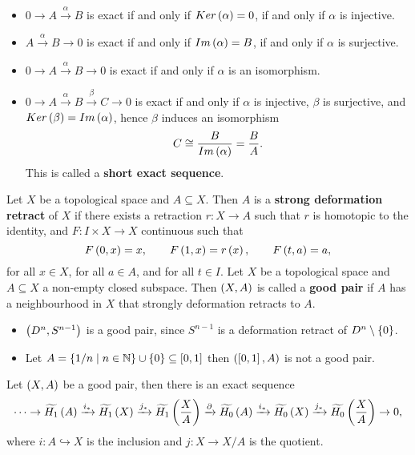 \begin{example*}
\hfill
\begin{itemize}
\item $ 0 \to A \xrightarrow{\alpha} B $ is exact if and only if $ Ker\left( \alpha \right) = 0 $, if and only if $ \alpha $ is injective.
\item $ A \xrightarrow{\alpha} B \to 0 $ is exact if and only if $ Im\left( \alpha \right) = B $, if and only if $ \alpha $ is surjective.
\item $ 0 \to A \xrightarrow{\alpha} B \to 0 $ is exact if and only if $ \alpha $ is an isomorphism.
\item $ 0 \to A \xrightarrow{\alpha} B \xrightarrow{\beta} C \to 0 $ is exact if and only if $ \alpha $ is injective, $ \beta $ is surjective, and $ Ker\left( \beta \right) = Im\left( \alpha \right) $, hence $ \beta $ induces an isomorphism
$$ C \cong \dfrac{B}{Im\left( \alpha \right)} = \dfrac{B}{A}. $$
This is called a \textbf{short exact sequence}.
\end{itemize}
\end{example*}

\begin{definition*}
Let $ X $ be a topological space and $ A \subseteq X $. Then $ A $ is a \textbf{strong deformation retract} of $ X $ if there exists a retraction $ r : X \to A $ such that $ r $ is homotopic to the identity, and $ F : I \times X \to X $ continuous such that
$$ F\left( 0, x \right) = x, \qquad F\left( 1, x \right) = r\left( x \right), \qquad F\left( t, a \right) = a, $$
for all $ x \in X $, for all $ a \in A $, and for all $ t \in I $. Let $ X $ be a topological space and $ A \subseteq X $ a non-empty closed subspace. Then $ \left( X, A \right) $ is called a \textbf{good pair} if $ A $ has a neighbourhood in $ X $ that strongly deformation retracts to $ A $.
\end{definition*}

\begin{example*}
\hfill
\begin{itemize}
\item $ \left( D^n, S^{n - 1} \right) $ is a good pair, since $ S^{n - 1} $ is a deformation retract of $ D^n \setminus \left\{ 0 \right\} $.
\item Let $ A = \left\{ 1 / n \mid n \in \mathbb{N} \right\} \cup \left\{ 0 \right\} \subseteq \left[ 0, 1 \right] $ then $ \left( \left[ 0, 1 \right], A \right) $ is not a good pair.
\end{itemize}
\end{example*}

\begin{theorem}
\label{thm:2.13}
Let $ \left( X, A \right) $ be a good pair, then there is an exact sequence
$$ \dots \to \widetilde{H_1}\left( A \right) \xrightarrow{i_*} \widetilde{H_1}\left( X \right) \xrightarrow{j_*} \widetilde{H_1}\left( \dfrac{X}{A} \right) \xrightarrow{\partial} \widetilde{H_0}\left( A \right) \xrightarrow{i_*} \widetilde{H_0}\left( X \right) \xrightarrow{j_*} \widetilde{H_0}\left( \dfrac{X}{A} \right) \to 0, $$
where $ i : A \hookrightarrow X $ is the inclusion and $ j : X \to X / A $ is the quotient.
\end{theorem}

